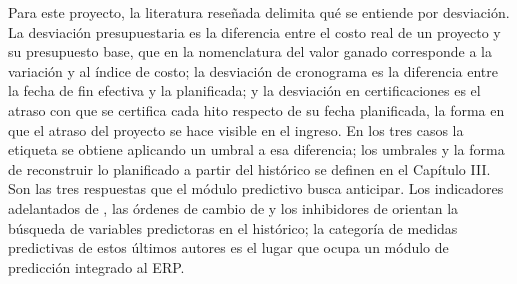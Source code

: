 Para este proyecto, la literatura reseñada delimita qué se entiende por desviación. La desviación presupuestaria es la diferencia entre el costo real de un proyecto y su presupuesto base, que en la nomenclatura del valor ganado corresponde a la variación y al índice de costo; la desviación de cronograma es la diferencia entre la fecha de fin efectiva y la planificada; y la desviación en certificaciones es el atraso con que se certifica cada hito respecto de su fecha planificada, la forma en que el atraso del proyecto se hace visible en el ingreso. En los tres casos la etiqueta se obtiene aplicando un umbral a esa diferencia; los umbrales y la forma de reconstruir lo planificado a partir del histórico se definen en el Capítulo III\@. Son las tres respuestas que el módulo predictivo busca anticipar. Los indicadores adelantados de \textcite{EPCleadingIndicators2018}, las órdenes de cambio de \textcite{Assaf2006} y los inhibidores de \textcite{Olawale2010} orientan la búsqueda de variables predictoras en el histórico; la categoría de medidas predictivas de estos últimos autores es el lugar que ocupa un módulo de predicción integrado al ERP\@.